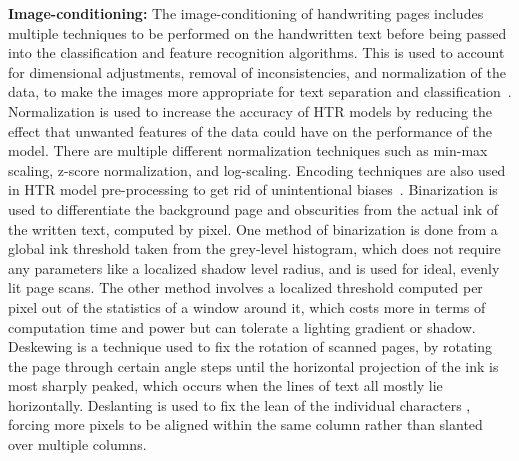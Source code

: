 \textbf{Image-conditioning:} The image-conditioning of handwriting pages includes multiple techniques to be performed on the handwritten text before being passed into the classification and feature recognition algorithms. This is used to account for dimensional adjustments, removal of inconsistencies, and normalization of the data, to make the images more appropriate for text separation and classification~\cite{hemanth2022}. Normalization is used to increase the accuracy of HTR models by reducing the effect that unwanted features of the data could have on the performance of the model. There are multiple different normalization techniques such as min-max scaling, z-score normalization, and log-scaling. Encoding techniques are also used in HTR model pre-processing to get rid of unintentional biases~\cite[pp.~40--41]{chen2023}. Binarization is used to differentiate the background page and obscurities from the actual ink of the written text, computed by pixel. One method of binarization is done from a global ink threshold taken from the grey-level histogram, which does not require any parameters like a localized shadow level radius, and is used for ideal, evenly lit page scans. The other method involves a localized threshold computed per pixel out of the statistics of a window around it, which costs more in terms of computation time and power but can tolerate a lighting gradient or shadow. Deskewing is a technique used to fix the rotation of scanned pages, by rotating the page through certain angle steps until the horizontal projection of the ink is most sharply peaked, which occurs when the lines of text all mostly lie horizontally. Deslanting is used to fix the lean of the individual characters , forcing more pixels to be aligned within the same column rather than slanted over multiple columns.

